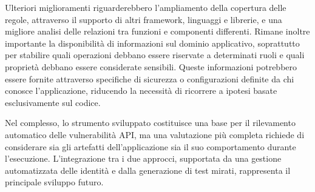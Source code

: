 Ulteriori miglioramenti riguarderebbero l'ampliamento della copertura delle regole, attraverso il supporto di altri framework, linguaggi e librerie, e una migliore analisi delle relazioni tra funzioni e componenti differenti. Rimane inoltre importante la disponibilità di informazioni sul dominio applicativo, soprattutto per stabilire quali operazioni debbano essere riservate a determinati ruoli e quali proprietà debbano essere considerate sensibili. Queste informazioni potrebbero essere fornite attraverso specifiche di sicurezza o configurazioni definite da chi conosce l'applicazione, riducendo la necessità di ricorrere a ipotesi basate esclusivamente sul codice.

Nel complesso, lo strumento sviluppato costituisce una base per il rilevamento automatico delle vulnerabilità API, ma una valutazione più completa richiede di considerare sia gli artefatti dell'applicazione sia il suo comportamento durante l'esecuzione. L'integrazione tra i due approcci, supportata da una gestione automatizzata delle identità e dalla generazione di test mirati, rappresenta il principale sviluppo futuro.
